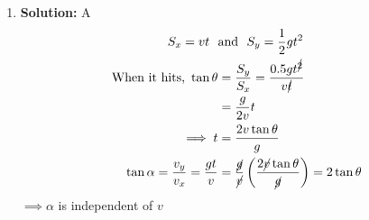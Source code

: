 \documentclass[11pt]{article}
\newcommand{\solution}[1]{\textbf{Solution: } #1 \hspace{5mm}}
\begin{document}
\begin{multicols}{2}
\begin{enumerate}
			\item \solution{A}
			\begin{align*}
				S_x = vt ~~&\text{and}~~ S_y = \frac{1}{2}gt^2 \\
				\text{When it hits,} ~\tan\theta &= \frac{S_y}{S_x} = \frac{0.5gt^{\cancel{2}}}{v\cancel{t}} \\ &= \frac{g}{2v}t \\
				\implies t &= \frac{2v\tan\theta}{g} \\
				\tan \alpha = \frac{v_y}{v_x} = \frac{gt}{v} &= \frac{\cancel{g}}{\cancel{v}}\left(\frac{2\cancel{v}\tan\theta}{\cancel{g}}\right) = 2\tan\theta
			\end{align*}
			$\implies \alpha$ is independent of $v$ 
		\end{enumerate}
	\end{multicols}
\end{document}
